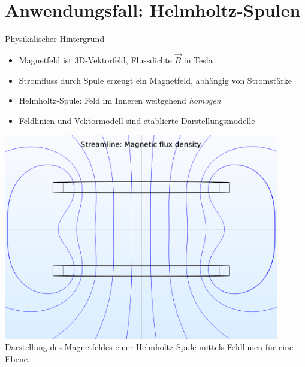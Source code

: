 \part{Anwendungsfall: Helmholtz-Spulen}
\label{part:physics}
\begin{frame}[fragile]{Physikalischer Hintergrund}
\begin{minipage}{0.5\textwidth}
	{
		\begin{itemize}[itemsep=1mm]
			\item Magnetfeld ist 3D-Vektorfeld, Flussdichte $\vec{B}$ in Tesla
			\item Stromfluss durch Spule erzeugt ein Magnetfeld, abhängig von Stromstärke
			\item Helmholtz-Spule: Feld im Inneren weitgehend \textit{homogen}
			\item Feldlinien und Vektormodell sind etablierte Darstellungsmodelle
		\end{itemize}
	}
\end{minipage}
\begin{minipage}{0.45\textwidth}
	\centering
	\includegraphics[width=0.9\textwidth]{images/papers/hh_mfield_nocol.png}\\
	\small Darstellung des Magnetfeldes einer Helmholtz-Spule mittels Feldlinien für eine Ebene.
\end{minipage}
\end{frame}
